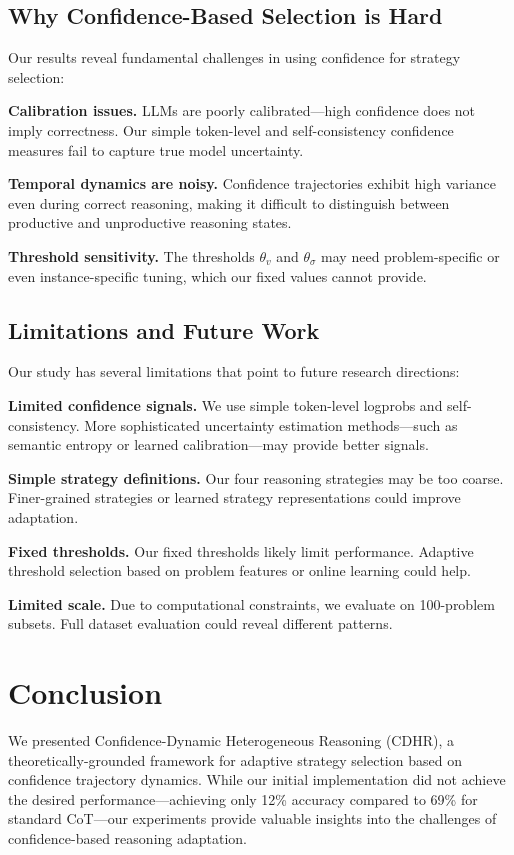 \documentclass{article}
\begin{document}
\subsection{Why Confidence-Based Selection is Hard}

Our results reveal fundamental challenges in using confidence for strategy selection:

\textbf{Calibration issues.} LLMs are poorly calibrated---high confidence does not imply correctness. Our simple token-level and self-consistency confidence measures fail to capture true model uncertainty.

\textbf{Temporal dynamics are noisy.} Confidence trajectories exhibit high variance even during correct reasoning, making it difficult to distinguish between productive and unproductive reasoning states.

\textbf{Threshold sensitivity.} The thresholds $\theta_v$ and $\theta_\sigma$ may need problem-specific or even instance-specific tuning, which our fixed values cannot provide.

\subsection{Limitations and Future Work}

Our study has several limitations that point to future research directions:

\textbf{Limited confidence signals.} We use simple token-level logprobs and self-consistency. More sophisticated uncertainty estimation methods---such as semantic entropy \citep{manakul2023selfcheckgpt} or learned calibration---may provide better signals.

\textbf{Simple strategy definitions.} Our four reasoning strategies may be too coarse. Finer-grained strategies or learned strategy representations could improve adaptation.

\textbf{Fixed thresholds.} Our fixed thresholds likely limit performance. Adaptive threshold selection based on problem features or online learning could help.

\textbf{Limited scale.} Due to computational constraints, we evaluate on 100-problem subsets. Full dataset evaluation could reveal different patterns.

\section{Conclusion}

We presented Confidence-Dynamic Heterogeneous Reasoning (CDHR), a theoretically-grounded framework for adaptive strategy selection based on confidence trajectory dynamics. While our initial implementation did not achieve the desired performance---achieving only 12\% accuracy compared to 69\% for standard CoT---our experiments provide valuable insights into the challenges of confidence-based reasoning adaptation.
\end{document}
